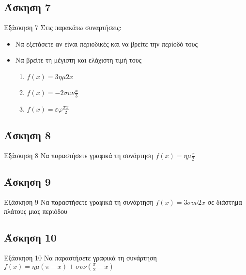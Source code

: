 \documentclass[greek]{beamer}
\begin{document}
\subsection{Άσκηση 7}
\begin{frame}[label=Άσκηση]{Εξάσκηση 7}
 Στις παρακάτω συναρτήσεις:
 \begin{itemize}
  \item Να εξετάσετε αν είναι περιοδικές και να βρείτε την περίοδό τους
  \item Να βρείτε τη μέγιστη και ελάχιστη τιμή τους
        \begin{enumerate}
         \item<1-> $f(x)=3ημ2x$
         \item<2-> $f(x)=-2συν\frac{x}{3}$
         \item<3-> $f(x)=εφ\frac{πx}{2}$
        \end{enumerate}
 \end{itemize}

\end{frame}

\subsection{Άσκηση 8}
\begin{frame}[label=Άσκηση8]{Εξάσκηση 8}
 Να παραστήσετε γραφικά τη συνάρτηση $f(x)=ημ\frac{x}{2}$

\end{frame}

\subsection{Άσκηση 9}
\begin{frame}[label=Άσκηση9]{Εξάσκηση 9}
 Να παραστήσετε γραφικά τη συνάρτηση $f(x)=3συν2x$ σε διάστημα πλάτους μιας περιόδου

\end{frame}

\subsection{Άσκηση 10}
\begin{frame}[label=Άσκηση10]{Εξάσκηση 10}
 Να παραστήσετε γραφικά τη συνάρτηση $f(x)=ημ(π-x)+συν(\frac{π}{2}-x)$

\end{frame}
\end{document}
